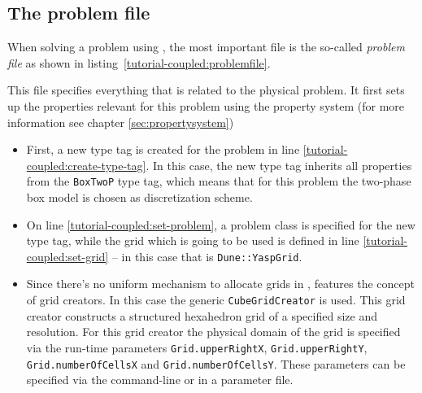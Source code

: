 \subsection{The problem file}

When solving a problem using \eWoms, the most important file is the
so-called \textit{problem file} as shown in
listing~\ref{tutorial-coupled:problemfile}.

\begin{lst}\label{tutorial-coupled:problemfile} \mbox{}

\end{lst}

This file specifies everything that is related to the physical
problem. It first sets up the properties relevant for this problem
using the \eWoms property system (for more information see chapter
\ref{sec:propertysystem})
\begin{itemize}
\item First, a new type tag is created for the problem in line
  \ref{tutorial-coupled:create-type-tag}.  In this case, the new type
  tag inherits all properties from the \texttt{BoxTwoP} type tag, which
  means that for this problem the two-phase box model is chosen as
  discretization scheme.
\item On line \ref{tutorial-coupled:set-problem}, a problem class is
  specified for the new type tag, while the grid which is going to be
  used is defined in line \ref{tutorial-coupled:set-grid} -- in this
  case that is \texttt{Dune::YaspGrid}.
\item Since there's no uniform mechanism to allocate grids in \Dune,
  \eWoms features the concept of grid creators. In this case the
  generic \texttt{CubeGridCreator} is used. This grid creator constructs a structured
  hexahedron grid of a specified size and resolution. For this grid
  creator the physical domain of the grid is specified via the
  run-time parameters \texttt{Grid.upperRightX},
  \texttt{Grid.upperRightY}, \texttt{Grid.numberOfCellsX} and
  \texttt{Grid.numberOfCellsY}. These parameters can be specified via
  the command-line or in a parameter file.
\end{itemize}

